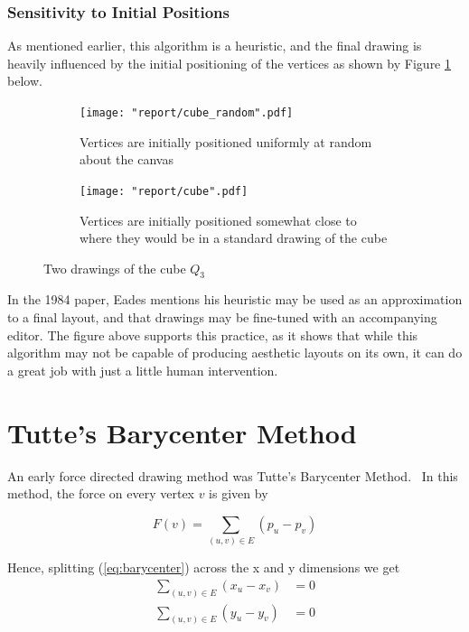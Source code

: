 \documentclass[11pt]{report}
\begin{document}
\subsubsection{Sensitivity to Initial Positions}
As mentioned earlier, this algorithm is a heuristic, and the final drawing is heavily influenced by the initial positioning of the vertices as shown by Figure \ref{fig:eades_sensitivity} below.

\begin{figure}[H]
    \centering
    \begin{subfigure}{.45\linewidth}
        \texttt{[image: "report/cube\_random".pdf]}
        \caption{Vertices are initially positioned uniformly at random about the canvas}
    \end{subfigure}
    \begin{subfigure}{.45\linewidth}
        \texttt{[image: "report/cube".pdf]}
        \caption{Vertices are initially positioned somewhat close to where they would be in a standard drawing of the cube}
    \end{subfigure}
    \caption{Two drawings of the cube $Q_3$}
    \label{fig:eades_sensitivity}
\end{figure}

In the 1984 paper, Eades mentions his heuristic may be used as an approximation to a final layout, and that drawings may be fine-tuned with an accompanying editor. The figure above supports this practice, as it shows that while this algorithm may not be capable of producing aesthetic layouts on its own, it can do a great job with just a little human intervention.

\section{Tutte's Barycenter Method}
An early force directed drawing method was Tutte's Barycenter Method.~\cite{tutte1963draw} In this method, the force on every vertex $v$ is given by 

\begin{equation}\label{eq:barycenter}
F(v) = \sum_{(u, v) \in E} (p_u - p_v)
\end{equation}

Hence, splitting (\ref{eq:barycenter}) across the x and y dimensions we get
\begin{equation}\label{eq:barycenter_split}
    \begin{aligned}
    \sum_{(u, v) \in E} (x_u - x_v) &= 0 \\
    \sum_{(u, v) \in E} (y_u - y_v) &= 0 \\
    \end{aligned}
\end{equation}
\end{document}
